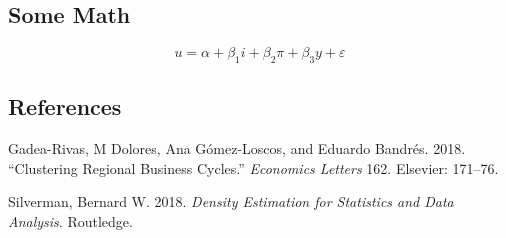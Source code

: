 \documentclass[]{article}
\begin{document}
\subsection{Some Math}\label{some-math}

\[
u = \alpha + \beta_1 i + \beta_2 \pi + \beta_3 y + \varepsilon
\]

\subsection*{References}\label{references}

\hypertarget{refs}{}
\hypertarget{ref-gadea18}{}
Gadea-Rivas, M Dolores, Ana Gómez-Loscos, and Eduardo Bandrés. 2018.
``Clustering Regional Business Cycles.'' \emph{Economics Letters} 162.
Elsevier: 171--76.

\hypertarget{ref-silverman18}{}
Silverman, Bernard W. 2018. \emph{Density Estimation for Statistics and
Data Analysis}. Routledge.
\end{document}
